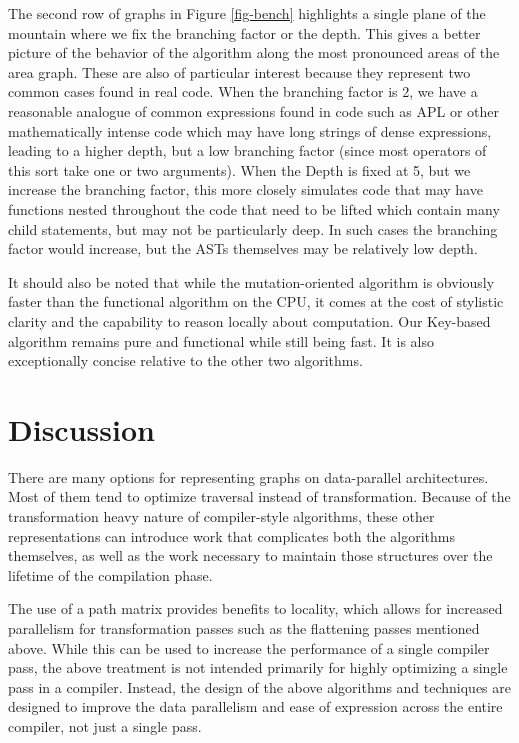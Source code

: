 ﻿\documentclass[numbers,10pt,preprint]{sigplanconf}
\begin{document}
The second row of graphs in Figure \ref{fig-bench} highlights a single plane of the mountain where we fix the branching factor or the depth. This gives a better picture of the behavior of the algorithm along the most pronounced areas of the area graph. These are also of particular interest because they represent two common cases found in real code. When the branching factor is 2, we have a reasonable analogue of common expressions found in code such as APL or other mathematically intense code which may have long strings of dense expressions, leading to a higher depth, but a low branching factor (since most operators of this sort take one or two arguments). When the Depth is fixed at 5, but we increase the branching factor, this more closely simulates code that may have functions nested throughout the code that need to be lifted which contain many child statements, but may not be particularly deep. In such cases the branching factor would increase, but the ASTs themselves may be relatively low depth. 

It should also be noted that while the mutation-oriented algorithm is obviously faster than the functional algorithm on the CPU, it comes at the cost of stylistic clarity and the capability to reason locally about computation. Our Key-based algorithm remains pure and functional while still being fast. It is also exceptionally concise relative to the other two algorithms.

\section{Discussion}

There are many options for representing graphs on data-parallel architectures. Most of them tend to optimize traversal instead of transformation. Because of the transformation heavy nature of compiler-style algorithms, these other representations can introduce work that complicates both the algorithms themselves, as well as the work necessary to maintain those structures over the lifetime of the compilation phase. 

The use of a path matrix provides benefits to locality, which allows for increased parallelism for transformation passes such as the flattening passes mentioned above. While this can be used to increase the performance of a single compiler pass, the above treatment is not intended primarily for highly optimizing a single pass in a compiler. Instead, the design of the above algorithms and techniques are designed to improve the data parallelism and ease of expression across the entire compiler, not just a single pass. 
\end{document}
